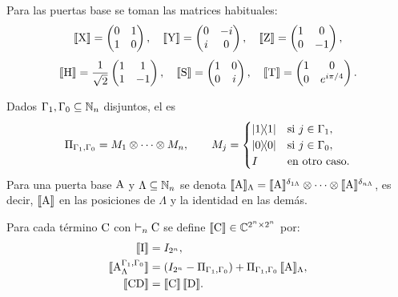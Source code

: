Para las puertas base se toman las matrices habituales:
\[
  \llbracket \text{X}\rrbracket=\begin{pmatrix}0&1\\1&0\end{pmatrix},\quad
  \llbracket \text{Y}\rrbracket=\begin{pmatrix}0&-i\\i&0\end{pmatrix},\quad
  \llbracket \text{Z}\rrbracket=\begin{pmatrix}1&0\\0&-1\end{pmatrix},
\]
\[
  \llbracket \text{H}\rrbracket=\frac{1}{\sqrt{2}}\begin{pmatrix}1&1\\1&-1\end{pmatrix},\quad
  \llbracket \text{S}\rrbracket=\begin{pmatrix}1&0\\0&i\end{pmatrix},\quad
  \llbracket \text{T}\rrbracket=\begin{pmatrix}1&0\\0&e^{i\pi/4}\end{pmatrix}.
\]

\begin{definition}
  \label{def:proyector-control}
  Dados $\Gamma_1,\Gamma_0\subseteq\mathbb{N}_n$ disjuntos, el  es
  \[
    \Pi_{\Gamma_1,\Gamma_0}=M_1\tensor\cdots\tensor M_n,
    \qquad
    M_j=\begin{cases}
      \dyad{1} & \text{si } j\in\Gamma_1, \\
      \dyad{0} & \text{si } j\in\Gamma_0, \\
      I        & \text{en otro caso.}
    \end{cases}
  \]
  Para una puerta base $\text{A}$ y $\Lambda\subseteq\mathbb{N}_n$ se denota
  $\llbracket \text{A}\rrbracket_\Lambda=\llbracket \text{A}\rrbracket^{\delta_{1\Lambda}}\otimes\cdots\otimes\llbracket \text{A}\rrbracket^{\delta_{n\Lambda}}$, es decir, $\llbracket \text{A}\rrbracket$ en las posiciones de $\Lambda$ y la identidad en las demás.
\end{definition}

\begin{definition}
  \label{def:semantica}
  Para cada término $\text{C}$ con $\vdash_n\text{C}$ se define $\llbracket \text{C}\rrbracket\in\mathbb{C}^{2^n\times 2^n}$ por:
  \begin{align*}
    \llbracket \text{I}\rrbracket                                 & = I_{2^n},                                                                                   \\
    \llbracket \text{A}^{\Gamma_1,\Gamma_0}_{\Lambda}\rrbracket & = \left(I_{2^n}-\Pi_{\Gamma_1,\Gamma_0}\right)+\Pi_{\Gamma_1,\Gamma_0}\,\llbracket \text{A}\rrbracket_\Lambda, \\
    \llbracket \text{C}\text{D}\rrbracket                         & = \llbracket \text{C}\rrbracket\,\llbracket \text{D}\rrbracket.
  \end{align*}
\end{definition}

